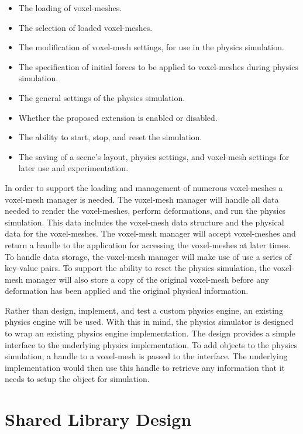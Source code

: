\begin{itemize}
  \item The loading of voxel-meshes.
  \item The selection of loaded voxel-meshes.
  \item The modification of voxel-mesh settings, for use in the physics simulation.
  \item The specification of initial forces to be applied to voxel-meshes during physics simulation.
  \item The general settings of the physics simulation.
  \item Whether the proposed extension is enabled or disabled.
  \item The ability to start, stop, and reset the simulation.
  \item The saving of a scene's layout, physics settings, and voxel-mesh settings for later use and
  experimentation.
\end{itemize}

In order to support the loading and management of numerous voxel-meshes a voxel-mesh manager is 
needed. The voxel-mesh manager will handle all data needed to render the voxel-meshes, perform
deformations, and run the physics simulation. This data includes the voxel-mesh data structure and
the physical data for the voxel-meshes. The voxel-mesh manager will accept voxel-meshes and return a 
handle to the application for accessing the voxel-meshes at later times. 
To handle data storage, the voxel-mesh manager will make use of use a series of key-value pairs. To 
support the ability to reset the physics simulation, the voxel-mesh manager will also store a
copy of the original voxel-mesh before any deformation has been applied and the original physical 
information.

Rather than design, implement, and test a custom physics engine, an existing physics engine will be
used. With this in mind, the physics simulator is designed to wrap an existing physics engine 
implementation. The design provides a simple interface to the underlying physics implementation. To 
add objects to the physics simulation, a handle to a voxel-mesh is passed to the interface. The 
underlying implementation would then use this handle to retrieve any information that it needs to 
setup the object for simulation. 

\section{Shared Library Design} \label{SharedLibrary}

